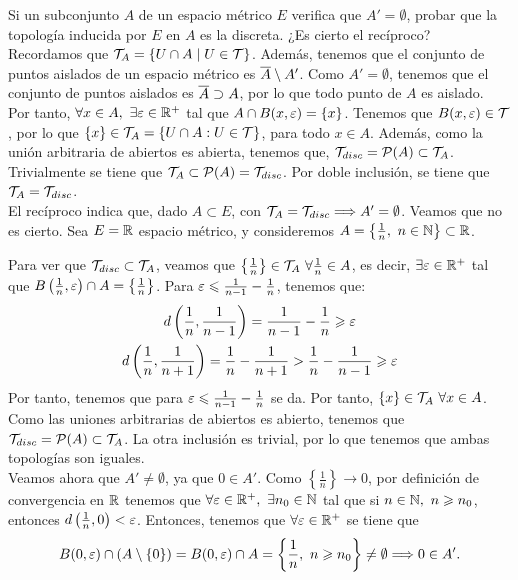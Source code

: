 \begin{ejercicio}
    Si un subconjunto $A$ de un espacio métrico $E$ verifica que $A'=\emptyset$, probar que la topología inducida por $E$ en $A$ es la discreta. ¿Es cierto el recíproco?\\

    Recordamos que $\mathcal{T}_A=\{U\cap A\mid U\in \mathcal{T}\}$. Además, tenemos que el conjunto de puntos aislados de un espacio métrico es $\overline{A}\setminus A'$. Como $A'=\emptyset$, tenemos que el conjunto de puntos aislados es $\overline{A}\supset A$, por lo que todo punto de $A$ es aislado.\\

    Por tanto, $\forall x\in A,~\exists \varepsilon\in \mathbb{R}^+$ tal que $A\cap B(x,\varepsilon)=\{x\}$. Tenemos que $B(x,\varepsilon)\in \mathcal{T}$, por lo que $\{x\}\in \mathcal{T}_A = \{U\cap A : U\in \mathcal{T}\}$, para todo $x\in A$. Además, como la unión arbitraria de abiertos es abierta, tenemos que, $\mathcal{T}_{disc}=\mathcal{P}(A)\subset \mathcal{T}_A$. Trivialmente se tiene que $\mathcal{T}_A\subset \mathcal{P}(A)=\mathcal{T}_{disc}$. Por doble inclusión, se tiene que $\mathcal{T}_A=\mathcal{T}_{disc}$.\\

    El recíproco indica que, dado $A\subset E$, con $\mathcal{T}_A=\mathcal{T}_{disc}\Longrightarrow A'=\emptyset$. Veamos que no es cierto. Sea $E=\mathbb{R}$ espacio métrico, y consideremos $A=\left\{\frac{1}{n},~n\in \mathbb{N}\right\}\subset \mathbb{R}$.

    Para ver que $\mathcal{T}_{disc}\subset \mathcal{T}_A$, veamos que $\left\{\frac{1}{n}\right\}\in \mathcal{T}_A~\forall \frac{1}{n}\in A$, es decir, $\exists \varepsilon\in \mathbb{R}^+$ tal que $B\left(\frac{1}{n},\varepsilon\right)\cap A=\left\{\frac{1}{n}\right\}$. Para $\varepsilon\leqslant \frac{1}{n-1}-\frac{1}{n}$, tenemos que:
    \begin{gather*}
        d\left(\frac{1}{n},\frac{1}{n-1}\right) = \frac{1}{n-1}-\frac{1}{n} \geqslant \varepsilon \\
        d\left(\frac{1}{n},\frac{1}{n+1}\right) = \frac{1}{n}-\frac{1}{n+1} > \frac{1}{n} - \frac{1}{n-1} \geqslant \varepsilon
    \end{gather*}
    Por tanto, tenemos que para $\varepsilon\leqslant \frac{1}{n-1}-\frac{1}{n}$ se da. Por tanto, $\left\{x\right\}\in \mathcal{T}_A~\forall x\in A$. Como las uniones arbitrarias de abiertos es abierto, tenemos que $\mathcal{T}_{disc}=\mathcal{P}(A)\subset \mathcal{T}_{A}$. La otra inclusión es trivial, por lo que tenemos que ambas topologías son iguales.\\

    Veamos ahora que $A'\neq \emptyset$, ya que $0\in A'$. Como $\left\{\frac{1}{n}\right\}\to 0$, por definición de convergencia en $\mathbb{R}$ tenemos que $\forall \varepsilon\in \mathbb{R}^+,~\exists n_0\in \mathbb{N}$ tal que si $n\in \mathbb{N},~n\geqslant n_0$, entonces $d\left(\frac{1}{n},0\right)<\varepsilon$. Entonces, tenemos que $\forall \varepsilon\in \mathbb{R}^+$ se tiene que $$B(0,\varepsilon)\cap (A\setminus \{0\})=B(0,\varepsilon)\cap A = \left\{\frac{1}{n},~n\geqslant n_0\right\}\neq \emptyset\Longrightarrow 0\in A'.$$
\end{ejercicio}

